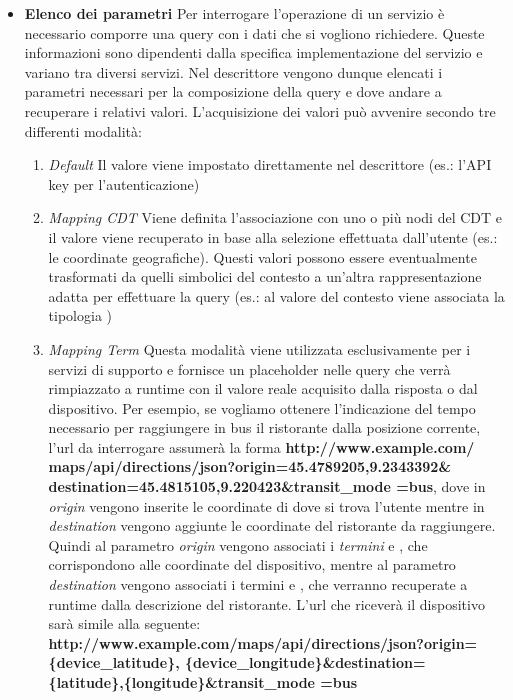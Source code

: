 \begin{itemize}
	\item \textbf{Elenco dei parametri} Per interrogare l'operazione di un servizio è necessario comporre una query con i dati che si vogliono richiedere. Queste informazioni sono dipendenti dalla specifica implementazione del servizio e variano tra diversi servizi. Nel descrittore vengono dunque elencati i parametri necessari per la composizione della query e dove andare a recuperare i relativi valori. L'acquisizione dei valori può avvenire secondo tre differenti modalità:
	\begin{enumerate}
		\item \emph{Default} Il valore viene impostato direttamente nel descrittore (es.: l'API key per l'autenticazione)
		\item \emph{Mapping CDT} Viene definita l'associazione con uno o più nodi del CDT e il valore viene recuperato in base alla selezione effettuata dall'utente (es.: le coordinate geografiche). Questi valori possono essere eventualmente trasformati da quelli simbolici del contesto a un'altra rappresentazione adatta per effettuare la query (es.: al valore  del contesto viene associata la tipologia )
		\item \emph{Mapping Term} Questa modalità viene utilizzata esclusivamente per i servizi di supporto e fornisce un placeholder nelle query che verrà rimpiazzato a runtime con il valore reale acquisito dalla risposta o dal dispositivo. Per esempio, se vogliamo ottenere l'indicazione del tempo necessario per raggiungere in bus il ristorante  dalla posizione corrente, l'url da interrogare assumerà la forma \textbf{http://www.example.com/\\maps/api/directions/json?origin=45.4789205,9.2343392\&\\destination=45.4815105,9.220423\&transit\_mode =bus}, dove in \emph{origin} vengono inserite le coordinate di dove si trova l'utente mentre in \emph{destination} vengono aggiunte le coordinate del ristorante da raggiungere. Quindi al parametro \emph{origin} vengono associati i \emph{termini}  e , che corrispondono alle coordinate del dispositivo, mentre al parametro \emph{destination} vengono associati i termini  e , che verranno recuperate a runtime dalla descrizione del ristorante. L'url che riceverà il dispositivo sarà simile alla seguente: \textbf{http://www.example.com/maps/api/directions/json?origin=\\\{device\_latitude\}, \{device\_longitude\}\&destination=\\\{latitude\},\{longitude\}\&transit\_mode =bus}

\end{enumerate}
\end{itemize}
